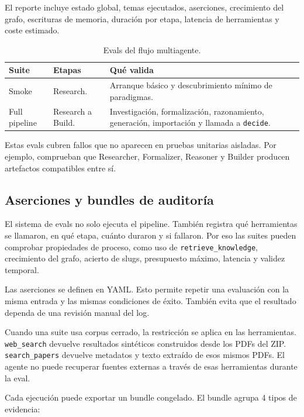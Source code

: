 El reporte incluye estado global, temas ejecutados, aserciones, crecimiento del
grafo, escrituras de memoria, duración por etapa, latencia de herramientas y
coste estimado.

\begin{table}[H]
\begin{center}
\small
\begin{tabular}{|p{3.2cm}|p{2.5cm}|p{6.6cm}|} \hline
\textbf{Suite} & \textbf{Etapas} & \textbf{Qué valida} \\ \hline
Smoke & Research. & Arranque básico y descubrimiento mínimo de paradigmas. \\ \hline
Full pipeline & Research a Build. & Investigación, formalización, razonamiento, generación, importación y llamada a \texttt{decide}. \\ \hline
\end{tabular}
\caption{Evals del flujo multiagente.}
\end{center}
\end{table}

Estas evals cubren fallos que no aparecen en pruebas unitarias aisladas. Por
ejemplo, comprueban que Researcher, Formalizer, Reasoner y Builder producen
artefactos compatibles entre sí.

\subsection{Aserciones y bundles de auditoría}
\label{ap:bundles-eval}

El sistema de evals no solo ejecuta el pipeline. También registra qué
herramientas se llamaron, en qué etapa, cuánto duraron y si fallaron. Por eso
las suites pueden comprobar propiedades de proceso, como uso de
\texttt{retrieve\_knowledge}, crecimiento del grafo, acierto de slugs,
presupuesto máximo, latencia y validez temporal.

Las aserciones se definen en YAML. Esto permite repetir una evaluación con la
misma entrada y las mismas condiciones de éxito. También evita que el resultado
dependa de una revisión manual del log.

Cuando una suite usa corpus cerrado, la restricción se aplica en las
herramientas. \texttt{web\_search} devuelve resultados sintéticos construidos
desde los PDFs del ZIP. \texttt{search\_papers} devuelve metadatos y texto
extraído de esos mismos PDFs. El agente no puede recuperar fuentes externas a
través de esas herramientas durante la eval.

Cada ejecución puede exportar un bundle congelado. El bundle agrupa 4 tipos de
evidencia:

